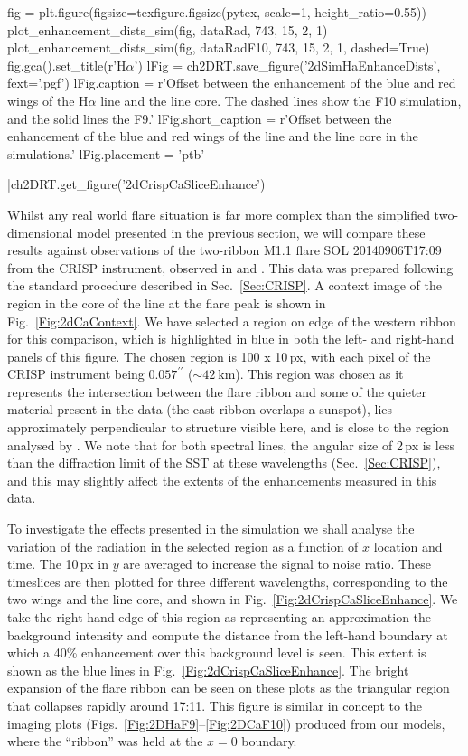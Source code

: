 \begin{pycode}[2DRT]
fig = plt.figure(figsize=texfigure.figsize(pytex, scale=1, height_ratio=0.55))
plot_enhancement_dists_sim(fig, dataRad, 743, 15, 2, 1)
plot_enhancement_dists_sim(fig, dataRadF10, 743, 15, 2, 1, dashed=True)
fig.gca().set_title(r'H$\alpha$')
lFig = ch2DRT.save_figure('2dSimHaEnhanceDists', fext='.pgf')
lFig.caption = r'Offset between the enhancement of the blue and red wings of the H$\alpha$ line and the line core. The dashed lines show the F10 simulation, and the solid lines the F9.'
lFig.short_caption = r'Offset between the enhancement of the blue and red wings of the \Ha{} line and the line core in the simulations.'
lFig.placement = 'ptb'
\end{pycode}

\py[2DRT]|ch2DRT.get_figure('2dCrispCaSliceEnhance')|

Whilst any real world flare situation is far more complex than the simplified two-dimensional model presented in the previous section, we will compare these results against observations of the two-ribbon M1.1 flare SOL 20140906T17:09 from the CRISP instrument, observed in \Ha{} and \CaLine{}.
This data was prepared following the standard procedure described in Sec.~\ref{Sec:CRISP}.
A context image of the region in the core of the \CaLine{} line at the flare peak is shown in Fig.~\ref{Fig:2dCaContext}.
We have selected a region on edge of the western ribbon for this comparison, which is highlighted in blue in both the left- and right-hand panels of this figure.
The chosen region is 100 x 10\,{}px, with each pixel of the CRISP instrument being $0.057^{\prime\prime}$ ($\sim\SI{42}{\kilo\metre}$).
This region was chosen as it represents the intersection between the flare ribbon and some of the quieter material present in the data (the east ribbon overlaps a sunspot), lies approximately perpendicular to structure visible here, and is close to the region analysed by \citet{Kuridze2015}.
We note that for both spectral lines, the angular size of 2\,px is less than the diffraction limit of the SST at these wavelengths (Sec.~\ref{Sec:CRISP}), and this may slightly affect the extents of the enhancements measured in this data.

To investigate the effects presented in the simulation we shall analyse the variation of the radiation in the selected region as a function of $x$ location and time.
The 10\,{}px in $y$ are averaged to increase the signal to noise ratio.
These timeslices are then plotted for three different wavelengths, corresponding to the two wings and the line core, and shown in Fig.~\ref{Fig:2dCrispCaSliceEnhance}.
We take the right-hand edge of this region as representing an approximation the background intensity and compute the distance from the left-hand boundary at which a 40\% enhancement over this background level is seen.
This extent is shown as the blue lines in Fig.~\ref{Fig:2dCrispCaSliceEnhance}.
The bright expansion of the flare ribbon can be seen on these plots as the triangular region that collapses rapidly around 17:11.
This figure is similar in concept to the imaging plots (Figs.~\ref{Fig:2DHaF9}--\ref{Fig:2DCaF10}) produced from our models, where the ``ribbon'' was held at the $x=0$ boundary.

